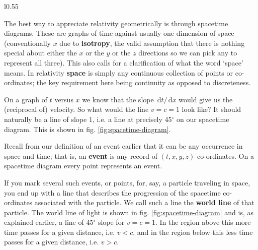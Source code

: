 \documentclass[english,seminar]{lecture}
\newcommand{\diff}{\,\textrm{d}}
\begin{document}
\begin{wrapfigure}{l}{0.55\textwidth}
	\vspace*{1cm}
	\caption{Basic spacetime diagram.}\label{fig:spacetime-diagram}
	\vspace*{1cm}
\end{wrapfigure}

The best way to appreciate relativity geometrically is through spacetime diagrams. These are graphs of time against usually one dimension of space (conventionally $x$ due to \textbf{isotropy}, the valid assumption that there is nothing special about either the $x$ or the $y$ or the $z$ directions so we can pick any to represent all three). This also calls for a clarification of what the word `space' means. In relativity \textbf{space} is simply any continuous collection of points or co-ordinates; the key requirement here being continuity as opposed to discreteness.

On a graph of $t$ versus $x$ we know that the slope $\diff t/\diff x$ would give us the (reciprocal of) velocity. So what would the line $v = c = 1$ look like? It should naturally be a line of slope $1$, i.e. a line at precisely 45$^\circ$ on our spacetime diagram. This is shown in fig. \ref{fig:spacetime-diagram}. 

Recall from our definition of an event earlier that it can be any occurrence in space and time; that is, an \textbf{event} is any record of $(t,x,y,z)$ co-ordinates. On a spacetime diagram every point represents an event.

If you mark several such events, or points, for, say, a particle traveling in space, you end up with a line that describes the progression of the spacetime co-ordinates associated with the particle. We call such a line the \textbf{world line} of that particle. The world line of light is shown in fig. \ref{fig:spacetime-diagram} and is, as explained earlier, a line of 45$^\circ$ slope for $v=c=1$. In the region above this more time passes for a given distance, i.e. $v<c$, and in the region below this less time passes for a given distance, i.e. $v>c$.
\end{document}
